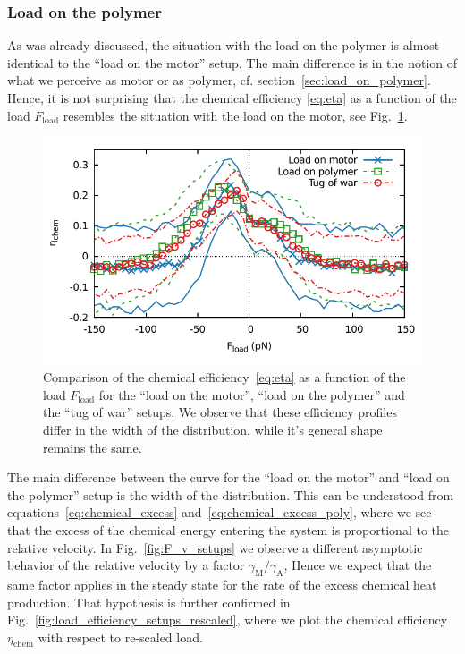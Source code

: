 \documentclass[aps,pre,twocolumn,showpacs,showkeys,superscriptaddress,floatfix]{revtex4-1}
\begin{document}
\subsubsection{Load on the polymer}
As was already discussed, the situation with the load on the polymer is almost identical to the ``load on the motor'' setup.
The main difference is in the notion of what we perceive as motor or as polymer, cf. section~\ref{sec:load_on_polymer}.
Hence, it is not surprising that the chemical efficiency \eqref{eq:eta} as a function of the load $F_\text{load}$ 
resembles the situation with the load on the motor, see Fig.~\ref{fig:load_efficiency_setups}. 
\begin{figure}[t]
\centering
\includegraphics[width=.9\linewidth,height=!]{F_eta_setup.pdf}
\caption{\label{fig:load_efficiency_setups}
Comparison of the chemical efficiency~\eqref{eq:eta} as a function of the load $F_\text{load}$ for the ``load on the motor'', ``load on the polymer'' and the ``tug of war'' setups.
We observe that these efficiency profiles differ in the width of the distribution, while it's general shape remains the same.   
}
\end{figure}
The main difference between the curve for the ``load on the motor'' and ``load on the polymer'' setup is the width of the distribution. 
This can be understood from equations~\eqref{eq:chemical_excess} and~\eqref{eq:chemical_excess_poly}, 
where we see that the excess of the chemical energy entering the system is proportional to the relative velocity.
In Fig.~\ref{fig:F_v_setups} we observe a different asymptotic behavior of the relative velocity by a factor $\gamma_\text{M} / \gamma_\text{A}$, Hence we expect that the same factor applies in the steady state for the rate of the excess chemical heat production. 
That hypothesis is further confirmed in Fig.~\ref{fig:load_efficiency_setups_rescaled},
where we plot the chemical efficiency $\eta_\text{chem}$ with respect to re-scaled load. 
\end{document}
